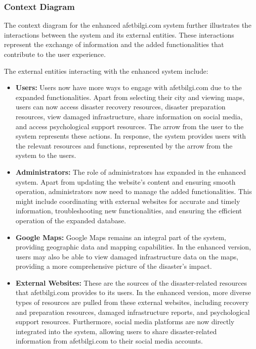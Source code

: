 \documentclass[12pt, letterpaper]{article}
\begin{document}
\newpage

\subsubsection{Context Diagram}
The context diagram for the enhanced afetbilgi.com system further illustrates the interactions between the system and its external entities. These interactions represent the exchange of information and the added functionalities that contribute to the user experience.

The external entities interacting with the enhanced system include:

\begin{itemize}
    \item \textbf{Users:} Users now have more ways to engage with afetbilgi.com due to the expanded functionalities. Apart from selecting their city and viewing maps, users can now access disaster recovery resources, disaster preparation resources, view damaged infrastructure, share information on social media, and access psychological support resources. The arrow from the user to the system represents these actions. In response, the system provides users with the relevant resources and functions, represented by the arrow from the system to the users.

    \item \textbf{Administrators:} The role of administrators has expanded in the enhanced system. Apart from updating the website's content and ensuring smooth operation, administrators now need to manage the added functionalities. This might include coordinating with external websites for accurate and timely information, troubleshooting new functionalities, and ensuring the efficient operation of the expanded database.

    \item \textbf{Google Maps:} Google Maps remains an integral part of the system, providing geographic data and mapping capabilities. In the enhanced version, users may also be able to view damaged infrastructure data on the maps, providing a more comprehensive picture of the disaster's impact.

    \item \textbf{External Websites:} These are the sources of the disaster-related resources that afetbilgi.com provides to its users. In the enhanced version, more diverse types of resources are pulled from these external websites, including recovery and preparation resources, damaged infrastructure reports, and psychological support resources. Furthermore, social media platforms are now directly integrated into the system, allowing users to share disaster-related information from afetbilgi.com to their social media accounts.

\end{itemize}
\end{document}
